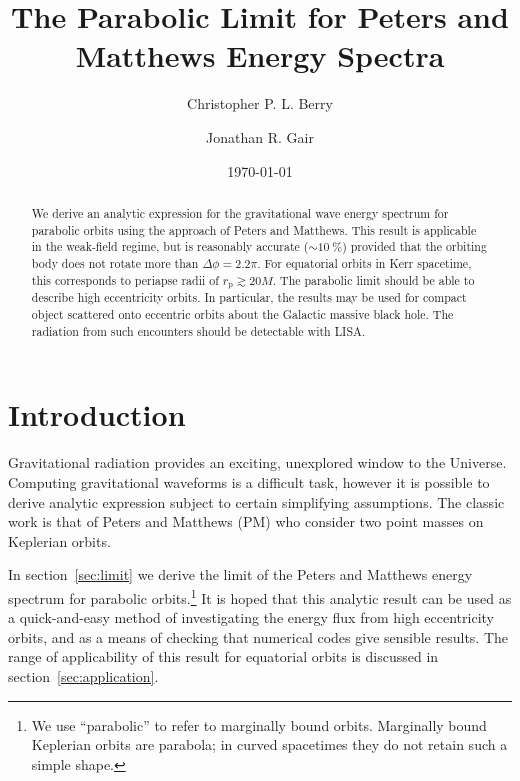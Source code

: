 \documentclass[aps,prd,reprint,showpacs,groupedaddress]{revtex4-1}
\newcommand{\secref}[1]{section~\ref{sec:#1}}
\newcommand{\sub}[1]{\ensuremath{_\text{#1}}}
\begin{document}

\title{The Parabolic Limit for Peters and Matthews Energy Spectra}

\author{Christopher P. L. Berry}
\author{Jonathan R. Gair}

\date{\today}

\begin{abstract}
We derive an analytic expression for the gravitational wave energy spectrum for parabolic orbits using the approach of Peters and Matthews. This result is applicable in the weak-field regime, but is reasonably accurate ($\sim \SI{10}{\percent}$) provided that the orbiting body does not rotate more than $\Delta \phi = 2.2\pi$. For equatorial orbits in Kerr spacetime, this corresponds to periapse radii of $r\sub{p} \gtrsim 20 M$. The parabolic limit should be able to describe high eccentricity orbits. In particular, the results may be used for compact object scattered onto eccentric orbits about the Galactic massive black hole. The radiation from such encounters should be detectable with LISA.
\end{abstract}


\maketitle

\section{Introduction}

Gravitational radiation provides an exciting, unexplored window to the Universe. Computing gravitational waveforms is a difficult task, however it is possible to derive analytic expression subject to certain simplifying assumptions. The classic work is that of Peters and Matthews\cite{Peters1963, Peters1964} (PM) who consider two point masses on Keplerian orbits.

In \secref{limit} we derive the limit of the Peters and Matthews energy spectrum for parabolic orbits.\footnote{We use ``parabolic'' to refer to marginally bound orbits. Marginally bound Keplerian orbits are parabola; in curved spacetimes they do not retain such a simple shape.} It is hoped that this analytic result can be used as a quick-and-easy method of investigating the energy flux from high eccentricity orbits, and as a means of checking that numerical codes give sensible results. The range of applicability of this result for equatorial orbits is discussed in \secref{application}.
\end{document}
